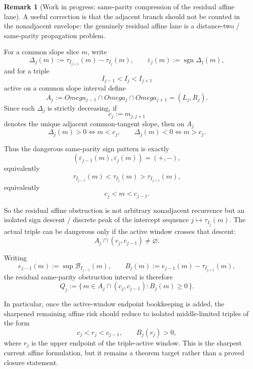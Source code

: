 \documentclass[11pt,a4paper]{amsart}
\def\Omega{Omega}%
\theoremstyle{plain}
\theoremstyle{definition}
\newtheorem{remark}[theorem]{Remark}
\begin{document}
\begin{remark}[Work in progress: same-parity compression of the residual affine lane]
\label{rem:wip-same-parity-compression-affine-lane}
A useful correction is that the adjacent branch should not be counted in the
nonadjacent envelope: the genuinely residual affine lane is a distance-two /
same-parity propagation problem.

For a common slope slice $m$, write
\[
\Delta_j(m):=\tau_{I_{j+1}}(m)-\tau_{I_j}(m),
\qquad
\varepsilon_j(m):=\operatorname{sgn}\Delta_j(m),
\]
and for a triple
\[
I_{j-1}<I_j<I_{j+1}
\]
active on a common slope interval define
\[
A_j:=\Omega_{j-1}\cap\Omega_j\cap\Omega_{j+1}=(L_j,R_j).
\]
Since each $\Delta_j$ is strictly decreasing, if
\[
c_j:=m_{j,j+1}
\]
denotes the unique adjacent common-tangent slope, then on $A_j$
\[
\Delta_j(m)>0 \iff m<c_j,
\qquad
\Delta_j(m)<0 \iff m>c_j.
\]

Thus the dangerous same-parity sign pattern is exactly
\[
(\varepsilon_{j-1}(m),\varepsilon_j(m))=(+,-),
\]
equivalently
\[
\tau_{I_{j-1}}(m)<\tau_{I_j}(m)>\tau_{I_{j+1}}(m),
\]
equivalently
\[
c_j<m<c_{j-1}.
\]

So the residual affine obstruction is not arbitrary nonadjacent recurrence but
an isolated sign descent / discrete peak of the intercept sequence
$j\mapsto \tau_{I_j}(m)$. The actual triple can be dangerous only if the
active window crosses that descent:
\[
A_j\cap(c_j,c_{j-1})\neq\varnothing.
\]

Writing
\[
e_{j-1}(m):=\sup \mathcal B_{I_{j-1}}(m),
\qquad
B_j(m):=e_{j-1}(m)-\tau_{I_{j+1}}(m),
\]
the residual same-parity obstruction interval is therefore
\[
Q_j:=\{\,m\in A_j\cap(c_j,c_{j-1}) : B_j(m)\ge 0\,\}.
\]

In particular, once the active-window endpoint bookkeeping is added, the
sharpened remaining affine risk should reduce to isolated middle-limited triples
of the form
\[
c_j<r_j<c_{j-1},
\qquad
B_j(r_j)>0,
\]
where $r_j$ is the upper endpoint of the triple-active window. This is the
sharpest current affine formulation, but it remains a theorem target rather
than a proved closure statement.
\end{remark}
\end{document}

